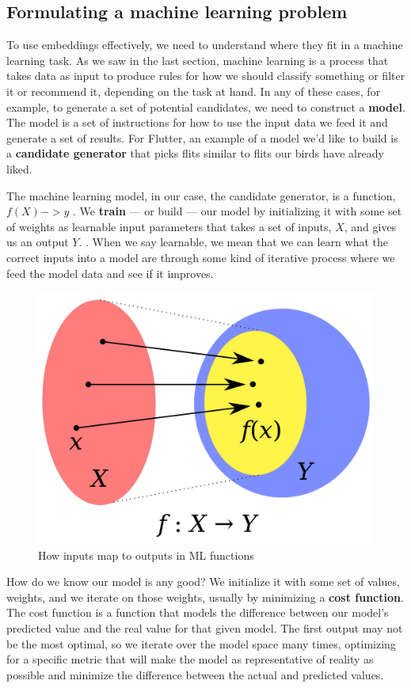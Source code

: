 \documentclass[11pt, table]{diazessay} %
\begin{document}
\begin{sloppypar}
\subsection{Formulating a machine learning problem}

To use embeddings effectively, we need to understand where they fit in a machine learning task. As we saw in the last section, machine learning is a process that takes data as input to produce rules for how we should classify something or filter it or recommend it, depending on the task at hand. In any of these cases, for example, to generate a set of potential candidates, we need to construct a \textbf{model}. The model is a set of instructions for how to use the input data we feed it and generate a set of results. For Flutter, an example of a model we'd like to build is a \textbf{candidate generator} that picks flits similar to flits our birds have already liked.

The machine learning model, in our case, the candidate generator,  is a function, $f(X) -> y$ . We \textbf{train} --- or build --- our model by initializing it with some set of weights as learnable input parameters  that takes a set of inputs, $X$, and gives us an output $Y$. . When we say learnable, we mean that we can learn what the correct inputs into a model are through some kind of iterative process where we feed the model data and see if it improves.

\begin{figure}[H]
  \includegraphics[width=.8\linewidth]{figures/function.png}
  \caption{How inputs map to outputs in ML functions \citep{klein2013coding}}
\end{figure}

How do we know our model is any good? We initialize it with some set of values, weights, and we iterate on those weights, usually by minimizing a \textbf{cost function}. The cost function is a function that models the difference between our model's predicted value and the real value for that given model. The first output may not be the most optimal, so we iterate over the model space many times, optimizing for a specific metric that will make the model as representative of reality as possible and minimize the difference between the actual and predicted values.  




\end{sloppypar}
\end{document}
